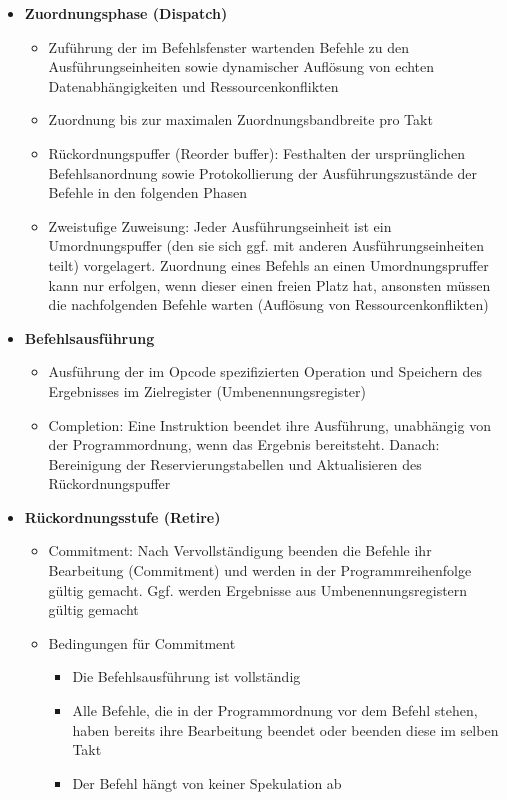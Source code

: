 \begin{itemize}
\begin{itemize}
	\end{itemize}
	\item \textbf{Zuordnungsphase (Dispatch)}
	\begin{itemize}
		\item Zuführung der im Befehlsfenster wartenden Befehle zu den Ausführungseinheiten sowie dynamischer Auflösung von echten Datenabhängigkeiten und Ressourcenkonflikten
		\item Zuordnung bis zur maximalen Zuordnungsbandbreite pro Takt
		\item Rückordnungspuffer (Reorder buffer): Festhalten der ursprünglichen Befehlsanordnung sowie Protokollierung der Ausführungszustände der Befehle in den folgenden Phasen
		\item Zweistufige Zuweisung: Jeder Ausführungseinheit ist ein Umordnungspuffer (den sie sich ggf. mit anderen Ausführungseinheiten teilt) vorgelagert. Zuordnung eines Befehls an einen Umordnungspruffer kann nur erfolgen, wenn dieser einen freien Platz hat, ansonsten müssen die nachfolgenden Befehle warten (Auflösung von Ressourcenkonflikten)
	\end{itemize}
	\item \textbf{Befehlsausführung}
	\begin{itemize}
		\item Ausführung der im Opcode spezifizierten Operation und Speichern des Ergebnisses im Zielregister (Umbenennungsregister)
		\item Completion: Eine Instruktion beendet ihre Ausführung, unabhängig von der Programmordnung, wenn das Ergebnis bereitsteht. Danach: Bereinigung der Reservierungstabellen und Aktualisieren des Rückordnungspuffer
	\end{itemize}
	\item \textbf{Rückordnungsstufe (Retire)}
	\begin{itemize}
		\item Commitment: Nach Vervollständigung beenden die Befehle ihr Bearbeitung (Commitment) und werden in der Programmreihenfolge gültig gemacht. Ggf. werden Ergebnisse aus Umbenennungsregistern gültig gemacht
		\item Bedingungen für Commitment
		\begin{itemize}
			\item Die Befehlsausführung ist vollständig
			\item Alle Befehle, die in der Programmordnung vor dem Befehl stehen, haben bereits ihre Bearbeitung beendet oder beenden diese im selben Takt
			\item Der Befehl hängt von keiner Spekulation ab

\end{itemize}
\end{itemize}
\end{itemize}
